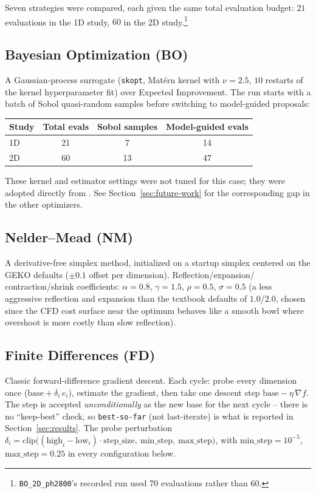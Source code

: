 Seven strategies were compared, each given the same total evaluation budget: $21$
evaluations in the 1D study, $60$ in the 2D study.\footnote{\texttt{BO\_2D\_ph2800}'s
recorded run used 70 evaluations rather than 60.}

\subsection{Bayesian Optimization (BO)}

A Gaussian-process surrogate (\texttt{skopt}, Mat\'ern kernel with $\nu=2.5$, $10$
restarts of the kernel hyperparameter fit) over Expected Improvement. The run
starts with a batch of Sobol quasi-random samples before switching to
model-guided proposals:

\begin{center}
\begin{tabular}{@{}lccc@{}}
\toprule
Study & Total evals & Sobol samples & Model-guided evals \\
\midrule
1D & 21 & 7  & 14 \\
2D & 60 & 13 & 47 \\
\bottomrule
\end{tabular}
\end{center}

These kernel and estimator settings were not tuned for this case; they were
adopted directly from \cite{bo_hyperparams_ref}. See
Section~\ref{sec:future-work} for the corresponding gap in the other
optimizers.

\subsection{Nelder--Mead (NM)}

A derivative-free simplex method, initialized on a startup simplex centered on
the GEKO defaults ($\pm 0.1$ offset per dimension). Reflection/expansion/
contraction/shrink coefficients: $\alpha=0.8$, $\gamma=1.5$, $\rho=0.5$,
$\sigma=0.5$ (a less aggressive reflection and expansion than the textbook
defaults of $1.0$/$2.0$, chosen since the CFD cost surface near the optimum
behaves like a smooth bowl where overshoot is more costly than slow reflection).

\subsection{Finite Differences (FD)}

Classic forward-difference gradient descent. Each cycle: probe every dimension
once ($\text{base} + \delta_i \, e_i$), estimate the gradient, then take one
descent step $\text{base} - \eta\,\nabla f$. The step is accepted
\emph{unconditionally} as the new base for the next cycle -- there is no
``keep-best'' check, so \texttt{best-so-far} (not last-iterate) is what is
reported in Section~\ref{sec:results}. The probe perturbation
$\delta_i = \text{clip}\bigl((\text{high}_i-\text{low}_i)\cdot\text{step\_size},\ \text{min\_step},\ \text{max\_step}\bigr)$,
with $\text{min\_step}=10^{-5}$, $\text{max\_step}=0.25$ in every configuration
below.

